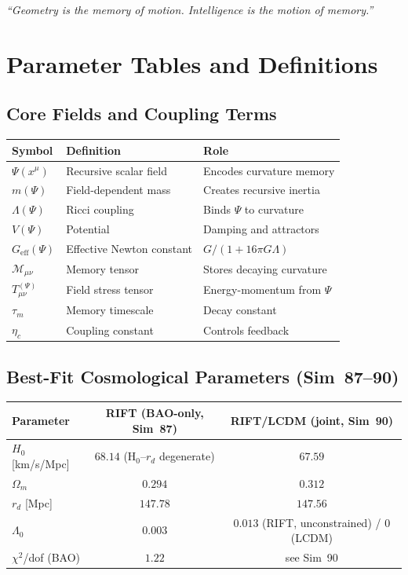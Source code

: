 \documentclass[12pt,a4paper]{article}
\begin{document}
\emph{``Geometry is the memory of motion. Intelligence is the motion of memory.''}

\appendix

\section{Parameter Tables and Definitions}
\label{app:params}

\subsection{Core Fields and Coupling Terms}

\begin{center}
\begin{tabular}{lll}
\toprule
Symbol & Definition & Role \\
\midrule
$\Psi(x^\mu)$ & Recursive scalar field & Encodes curvature memory \\
$m(\Psi)$ & Field-dependent mass & Creates recursive inertia \\
$\Lambda(\Psi)$ & Ricci coupling & Binds $\Psi$ to curvature \\
$V(\Psi)$ & Potential & Damping and attractors \\
$G_{\mathrm{eff}}(\Psi)$ & Effective Newton constant & $G/(1+16\pi G\Lambda)$ \\
$\mathcal{M}_{\mu\nu}$ & Memory tensor & Stores decaying curvature \\
$T^{(\Psi)}_{\mu\nu}$ & Field stress tensor & Energy-momentum from $\Psi$ \\
$\tau_m$ & Memory timescale & Decay constant \\
$\eta_c$ & Coupling constant & Controls feedback \\
\bottomrule
\end{tabular}
\end{center}

\subsection{Best-Fit Cosmological Parameters (Sim~87--90)}

\begin{center}
\begin{tabular}{lcc}
\toprule
Parameter & RIFT (BAO-only, Sim~87) & RIFT/LCDM (joint, Sim~90) \\
\midrule
$H_0$ [km/s/Mpc] & $68.14$ (H$_0$--$r_d$ degenerate) & $67.59$ \\
$\Omega_m$ & $0.294$ & $0.312$ \\
$r_d$ [Mpc] & $147.78$ & $147.56$ \\
$\Lambda_0$ & $0.003$ & $0.013$ (RIFT, unconstrained) / 0 (LCDM) \\
$\chi^2$/dof (BAO) & $1.22$ & see Sim~90 \\
\bottomrule
\end{tabular}
\end{center}
\end{document}
